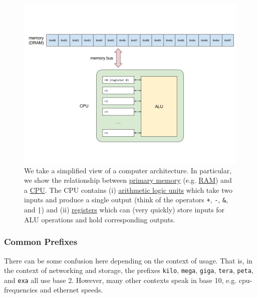 \documentclass[12pt,letterpaper,twoside]{article}
\begin{document}
\begin{figure}[!h]
\centering
\includegraphics[scale=0.25]{fig/model-computer.png}
\caption{\footnotesize We take a simplified view of a computer architecture. In
  particular, we show the relationship between
  \href{https://en.wikipedia.org/wiki/Computer_data_storage\#Primary_storage}{primary
    memory}
  (e.g. \href{https://en.wikipedia.org/wiki/Random-access_memory}{RAM})
  and a
  \href{https://en.wikipedia.org/wiki/Central_processing_unit}{CPU}. The
  CPU contains (i)
  \href{https://en.wikipedia.org/wiki/Arithmetic_logic_unit\#Functions}{arithmetic
    logic units} which take two inputs and produce a single output
  (think of the operators \texttt{+}, \texttt{-}, \texttt{\&}, and \texttt{|}) and (ii)
  \href{https://en.wikipedia.org/wiki/Processor_register}{registers}
  which can (very quickly) store inputs for ALU operations and hold corresponding outputs.}
\end{figure}

\subsubsection{Common Prefixes}
There can be some confusion here depending on the context of
usage. That is, in the context of networking and storage, the prefixes
\texttt{kilo}, \texttt{mega}, \texttt{giga}, \texttt{tera},
\texttt{peta}, and \texttt{exa} all use base 2. However, many other
contexts speak in base 10, e.g. cpu-frequencies and ethernet speeds.
\end{document}
